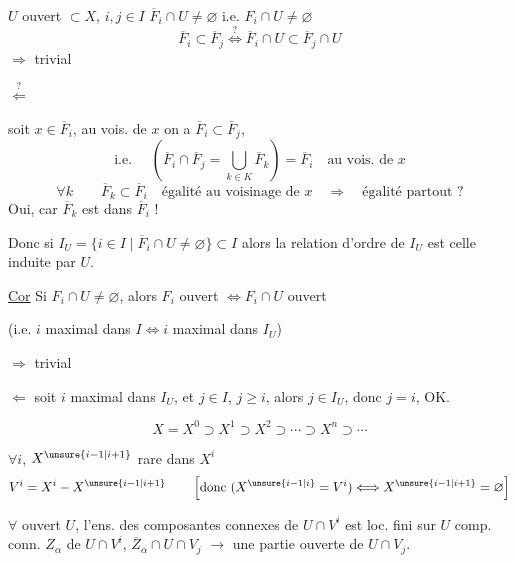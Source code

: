 $U$ ouvert $\subset X$, $i,j\in I$ \quad $\overline F_i\cap U\neq\varnothing$ i.e. $F_i\cap U\neq\varnothing$
\[
\overline F_i\subset\overline F_j
\overset{?}{\Longleftrightarrow}
\overline F_i\cap U\subset\overline F_j\cap U
\]
$\Rightarrow$ trivial

$\overset{?}{\Leftarrow}$


 soit $x\in\overline F_i$, au vois. de $x$ on a $\overline F_i\subset\overline F_j$,
\[
\text{i.e. }\quad
\left(\overline F_i\cap\overline F_j=\bigcup_{k\in K}\overline F_k\right)=\overline F_i
\quad\text{au vois. de }x
\]
\[
\forall k\qquad \overline F_k\subset\overline F_i
\quad\text{égalité au voisinage de }x
\quad\Longrightarrow\quad\text{égalité partout ?}
\]
Oui, car $\overline F_k$ est \uline{} dans $\overline F_i$ !

Donc si $I_U=\{i\in I\mid\overline F_i\cap U\neq\varnothing\}\subset I$
alors la relation d'ordre de $I_U$ est celle induite par $U$.

\uline{Cor} Si $F_i\cap U\neq\varnothing$, alors $F_i$ ouvert $\Longleftrightarrow F_i\cap U$ ouvert

(i.e. $i$ maximal dans $I\Longleftrightarrow i$ maximal dans $I_U$)


$\Rightarrow$ trivial

$\Leftarrow$ soit $i$ maximal dans $I_U$, et $j\in I$, $j\geq i$, alors $j\in I_U$, donc $j=i$, OK.

\[
X=X^0\supset X^1\supset X^2\supset\cdots\supset X^n\supset\cdots
\]

$\forall i$,  $X^{\unsure{i-1|i+1}}$ rare dans $X^i$
\[
V^i=X^i-X^{\unsure{i-1|i+1}}
\qquad
\left[\text{donc }(X^{\unsure{i-1|i}}=V^i)\Longleftrightarrow X^{\unsure{i-1|i+1}}=\varnothing\right]
\]

$\forall$ ouvert $U$, l'ens. des composantes connexes de $U\cap V^i$ est loc. fini sur $U$
 \deleted{$\unsure{\forall}$} comp. conn. $Z_\alpha$ de $U\cap V^i$,
 $\overline Z_\alpha\cap U\cap V_j$
$\longrightarrow$ une partie ouverte de $U\cap V_j$.

